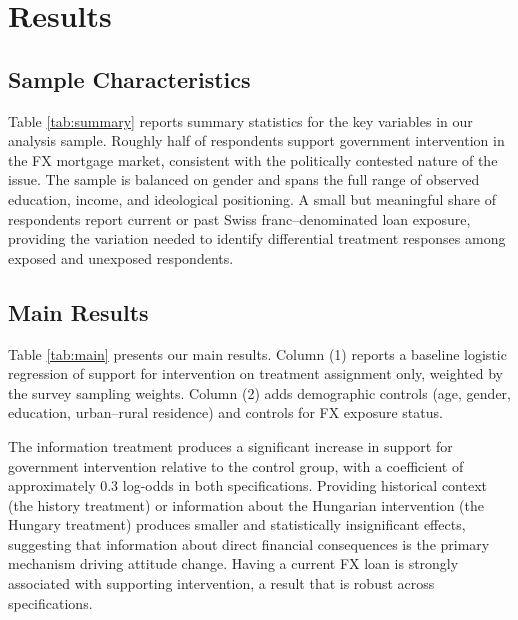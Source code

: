 \documentclass[12pt]{article}
\begin{document}

\section{Results}

\subsection{Sample Characteristics}

Table \ref{tab:summary} reports summary statistics for the key variables in our analysis sample. Roughly half of respondents support government intervention in the FX mortgage market, consistent with the politically contested nature of the issue. The sample is balanced on gender and spans the full range of observed education, income, and ideological positioning. A small but meaningful share of respondents report current or past Swiss franc--denominated loan exposure, providing the variation needed to identify differential treatment responses among exposed and unexposed respondents.

\begin{table}[h]
  \centering
  \caption{Summary Statistics}
  \label{tab:summary}
  
\end{table}

\subsection{Main Results}

Table \ref{tab:main} presents our main results. Column (1) reports a baseline logistic regression of support for intervention on treatment assignment only, weighted by the survey sampling weights. Column (2) adds demographic controls (age, gender, education, urban--rural residence) and controls for FX exposure status.

The information treatment produces a significant increase in support for government intervention relative to the control group, with a coefficient of approximately 0.3 log-odds in both specifications. Providing historical context (the history treatment) or information about the Hungarian intervention (the Hungary treatment) produces smaller and statistically insignificant effects, suggesting that information about direct financial consequences is the primary mechanism driving attitude change. Having a current FX loan is strongly associated with supporting intervention, a result that is robust across specifications.
\end{document}
